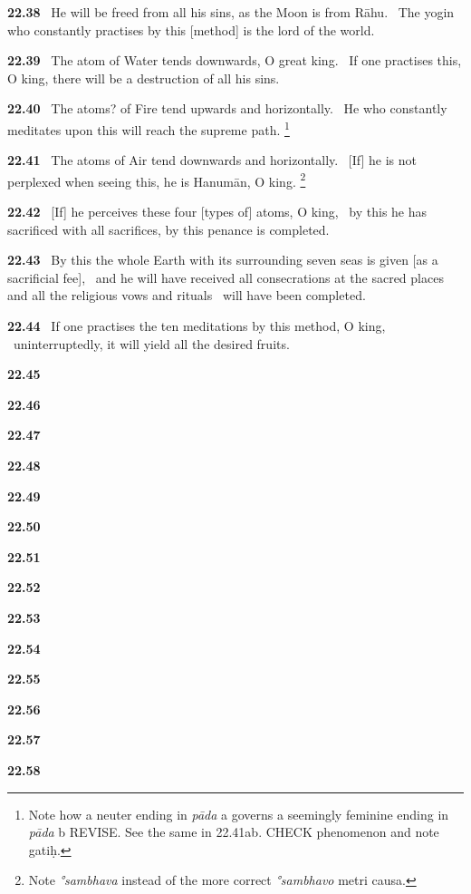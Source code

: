 \documentclass{article}
\newcommand{\skt}[1]{\textit{#1}}
\begin{document}
\textbf{22.38}%
\ He will be freed from all his sins, as the Moon is from Rāhu.%
\                  The yogin who constantly practises by this [method] is the lord of the world.%


\textbf{22.39}%
\ The atom of Water tends downwards, O great king.%
\                  If one practises this, O king, there will be a destruction of all his sins.%


\textbf{22.40}%
\ The atoms? of Fire tend upwards and horizontally.%
\                 He who constantly meditates upon this will reach the supreme path.%
\footnote{Note how a neuter ending in \skt{pāda} a governs a seemingly feminine ending in \skt{pāda} b REVISE. See the                 same in 22.41ab. CHECK phenomenon and note gatiḥ. }%


\textbf{22.41}%
\ The atoms of Air tend downwards and horizontally.%
\                [If] he is not perplexed when seeing this, he is Hanumān, O king.%
\footnote{Note \skt{°sambhava} instead of the more correct \skt{°sambhavo} metri causa. }%


\textbf{22.42}%
\ [If] he perceives these four [types of] atoms, O king,%
\          by this he has sacrificed with all sacrifices, by this penance is completed.%


\textbf{22.43}%
\ By this the whole Earth with its surrounding seven seas is given [as a sacrificial fee],%
\                 and he will have received all consecrations at the sacred places and all the religious vows and rituals%
\                                         will have been completed.%


\textbf{22.44}%
\ If one practises the ten meditations by this method, O king,%
\                  uninterruptedly, it will yield all the desired fruits.%


\textbf{22.45}%


\textbf{22.46}%


\textbf{22.47}%


\textbf{22.48}%


\textbf{22.49}%


\textbf{22.50}%


\textbf{22.51}%


\textbf{22.52}%


\textbf{22.53}%


\textbf{22.54}%


\textbf{22.55}%


\textbf{22.56}%


\textbf{22.57}%


\textbf{22.58}%
\end{document}

